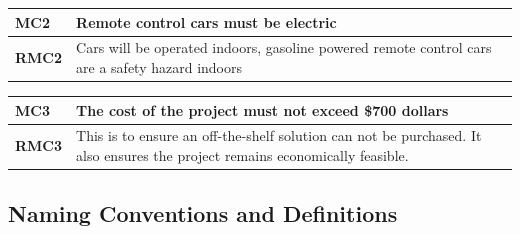 \documentclass [11pt]{article}
\begin{document}
\begin{longtable}{| p{ } | p{ } | }\hline 

\textbf{MC2}& \textbf{Remote control cars must be electric}\\ \hline 
\textbf{RMC2} & Cars will be operated indoors, gasoline powered remote control cars are a safety hazard indoors\\ \hline 

\end{longtable}

\begin{longtable}{| p{ } | p{ } | }\hline 
\textbf{MC3} & \textbf{The cost of the project must not exceed \$700 dollars} \\ \hline
\textbf{RMC3} & This is to ensure an off-the-shelf solution can not be purchased. It also ensures the project remains economically feasible. \\ \hline
\end{longtable}


\subsection{Naming Conventions and Definitions}
\end{document}
